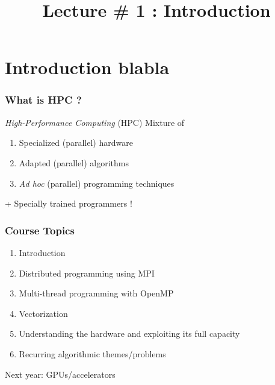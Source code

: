 \documentclass[xcolor={x11names,svgnames,psnames}]{beamer}
\title{Lecture \# 1 : Introduction}
\begin{document}

\section{Introduction blabla}

\begin{frame}[label=title]
  \titlepage
\end{frame}
 
 

\begin{frame}
\frametitle{What is HPC ?}


\begin{alertblock}{\emph{High-Performance Computing} (HPC)}
  Mixture of
  \begin{enumerate}
  \item Specialized (parallel) hardware 
  \item Adapted (parallel) algorithms 
  \item \textit{Ad hoc} (parallel) programming techniques
  \end{enumerate}
\end{alertblock}

\medskip

+ Specially trained programmers !

\end{frame}


 

\begin{frame}
  \frametitle{Course Topics}
  
  \begin{enumerate}%
  \item Introduction
  \item Distributed programming using MPI
  \item Multi-thread programming with OpenMP
  \item Vectorization
  \item Understanding the hardware and exploiting its full capacity 
  \item Recurring algorithmic themes/problems
  \end{enumerate}

  \bigskip
  
  \alert{Next year: GPUs/accelerators} 
\end{frame}
\end{document}
